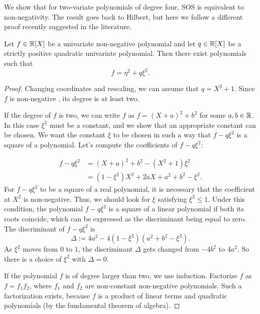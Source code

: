 We show that for two-variate polynomials of degree four, SOS is equivalent to non-negativity. The result goes back to Hilbert, but here we follow a different proof recently suggested in the literature. 

\begin{lemma}
	\label{ternary:quartics:lem}
	Let $f \in \mathbb{R}[X]$ be a univariate non-negative polynomial and let $q \in \mathbb{R}[X]$ be a strictly positive quadratic univariate polynomial. Then there exist polynomials \blue{$\eta, \xi \in \R[X]$} such that 
	\[
		f = \eta^2 + q \xi^2.
	\]
\end{lemma}
\begin{proof}
	Changing coordinates and rescaling, we can assume that $q = X^2 + 1$. Since $f$ is non-negative , its degree is at least two. 
	
	If the degree of $f$ is two, we can write $f$ as $f = (X+a)^2 + b^2$ for some $a,b \in \mathbb{R}$. In this case $\xi^2$ must be a constant, and we show that an appropriate constant can be chosen. We want the constant $\xi$ to be chosen in such a way that $f- q\xi^2$ is a square of a polynomial. Let's compute the coefficients of $f-q \xi^2$:
	
	\begin{align*}
		f - q \xi^2 & = (X+a)^2 + b^2 - (X^2 + 1) \xi^2 
		\\ & = (1-\xi^2) X^2 + 2 a X + a^2 + b^2 - \xi^2.
	\end{align*}
	For $f-q \xi^2$ to be a square of a real polynomial, it is necessary that the coefficient at $X^2$ is non-negative. Thus, we should look for $\xi$ satisfying  $\xi^2 \le 1$. Under this condition, the polynomial $f- q \xi^2$ is a square of a linear polynomial if both its roots coincide, which can be expressed as the discriminant being equal to zero. The discriminant of $f - q \xi^2$ is 
	\[
		\Delta := 4 a^2 - 4 (1-\xi^2) (a^2 + b^2 -\xi^2).
	\] 
	As $\xi^2$ moves from $0$ to $1$, the discriminant $\Delta$ gets changed from $- 4 b^2$ to $4 a^2$. So there is a choice of $\xi^2$ with $\Delta=0$. 
	
	If the polynomial $f$ is of degree larger than two, we use induction. Factorize $f$ as $f=f_1 f_2$, where $f_1$ and $f_2$ are non-constant non-negative polynomials. Such a factorization exists, because $f$ is a product of linear terms and quadratic polynomials (by the fundamental theorem of algebra).
	

\end{proof}
